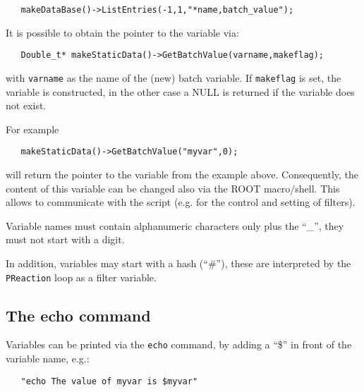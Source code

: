 \begin{verbatim}
   makeDataBase()->ListEntries(-1,1,"*name,batch_value");
\end{verbatim}

It is possible to obtain the pointer to the variable via:

\begin{verbatim}
   Double_t* makeStaticData()->GetBatchValue(varname,makeflag);
\end{verbatim}

with {\tt varname} as the name of the (new) batch variable. If
{\tt makeflag} is set, the variable is constructed, in the other case
a NULL is returned if the variable does not exist.

For example

\begin{verbatim}
   makeStaticData()->GetBatchValue("myvar",0);
\end{verbatim}

will return the pointer to the variable from the example above. Consequently,
the content of this variable can be changed also via the ROOT macro/shell.
This allows to communicate with the script (e.g. for the control and setting
of filters).


Variable names must contain alphanumeric characters only plus the ``\_'', they
must not start with a digit.


In addition, variables may start with a hash (``\#''), these are interpreted
by the {\tt PReaction} loop as a filter variable.

\subsection{The echo command}

Variables can be printed via the {\tt echo} command, by adding a
``\$'' in front of the variable name, e.g.:

\begin{verbatim}
   "echo The value of myvar is $myvar"
\end{verbatim}


